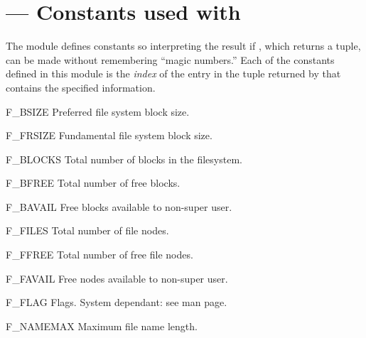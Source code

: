 \section{ ---
         Constants used with }


The  module defines constants so interpreting the result
if , which returns a tuple, can be made without
remembering ``magic numbers.''  Each of the constants defined in this
module is the \emph{index} of the entry in the tuple returned by
 that contains the specified information.


\begin{datadesc}{F_BSIZE}
Preferred file system block size.
\end{datadesc}

\begin{datadesc}{F_FRSIZE}
Fundamental file system block size.
\end{datadesc}

\begin{datadesc}{F_BLOCKS}
Total number of blocks in the filesystem.
\end{datadesc}

\begin{datadesc}{F_BFREE}
Total number of free blocks.
\end{datadesc}

\begin{datadesc}{F_BAVAIL}
Free blocks available to non-super user.
\end{datadesc}

\begin{datadesc}{F_FILES}
Total number of file nodes.
\end{datadesc}

\begin{datadesc}{F_FFREE}
Total number of free file nodes.
\end{datadesc}

\begin{datadesc}{F_FAVAIL}
Free nodes available to non-super user.
\end{datadesc}

\begin{datadesc}{F_FLAG}
Flags. System dependant: see  man page.
\end{datadesc}

\begin{datadesc}{F_NAMEMAX}
Maximum file name length.
\end{datadesc}
